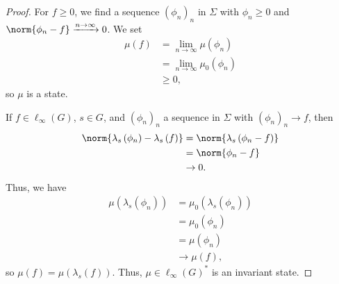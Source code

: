 \begin{proof}
  For $f\geq 0$, we find a sequence $\left(\phi_n\right)_n$ in $\Sigma$ with $\phi_n\geq 0$ and $\norm{\phi_n - f} \xrightarrow{n\rightarrow\infty}0$. We set
  \begin{align*}
    \mu\left(f\right) &= \lim_{n\rightarrow\infty}\mu\left(\phi_n\right)\\
                      &= \lim_{n\rightarrow\infty}\mu_0\left(\phi_n\right)\\
                      &\geq 0,
  \end{align*}
  so $\mu$ is a state.\newline

  If $f\in \ell_{\infty}\left(G\right)$, $s\in G$, and $\left(\phi_n\right)_n$ a sequence in $\Sigma$ with $\left(\phi_n\right)_n\rightarrow f$, then
  \begin{align*}
    \norm{\lambda_s\left(\phi_n\right) - \lambda_s\left(f\right)} &= \norm{\lambda_s\left(\phi_n - f\right)}\\
                                                                  &= \norm{\phi_n - f}\\
                                                                  &\rightarrow 0.
  \end{align*}
  Thus, we have
  \begin{align*}
    \mu\left(\lambda_s\left(\phi_n\right)\right) &= \mu_0\left(\lambda_s\left(\phi_n\right)\right)\\
                                                 &= \mu_0\left(\phi_n\right)\\
                                                 &= \mu\left(\phi_n\right)\\
                                                 &\rightarrow \mu\left(f\right),
  \end{align*}
  so $\mu\left(f\right) = \mu\left(\lambda_s\left(f\right)\right)$. Thus, $\mu\in \ell_{\infty}\left(G\right)^{\ast}$ is an invariant state.
\end{proof}
